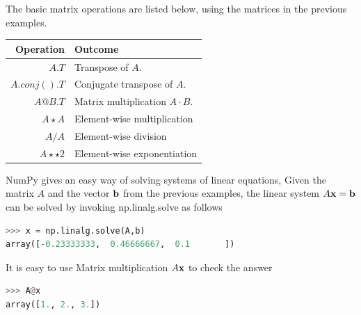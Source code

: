 The basic matrix operations are listed below, using the matrices in the previous examples. 
\vs

\begin{tabular}{r|l}
Operation 		& Outcome \\
\hline
{\s$A.T$} 	&  Transpose of $A$.\\
{\s$A.conj().T$} 	&  Conjugate transpose of $A$.\\
{\s$A@B.T$} 			&  Matrix multiplication $A \cdot B$. \\
{\s$A\star A$} 		&  Element-wise multiplication\\
{\s$A/A$} 		&  Element-wise division\\
{\s$A\star\star 2$} 		&  Element-wise exponentiation\\
\hline
\end{tabular}

\vs

NumPy gives an easy way of solving systems of linear equations, Given the matrix $A$ and the vector $\textbf{b}$ from the previous examples, the linear system $A\textbf{x} = \textbf{b}$ can be solved by invoking {\s np.linalg.solve} as follows

\begin{lstlisting}[language=Python]
>>> x = np.linalg.solve(A,b)
array([-0.23333333,  0.46666667,  0.1       ])
\end{lstlisting}

It is easy to use Matrix multiplication $A\textbf{x}$ to check the answer

\begin{lstlisting}[language=Python]
>>> A@x
array([1., 2., 3.])
\end{lstlisting}


 

